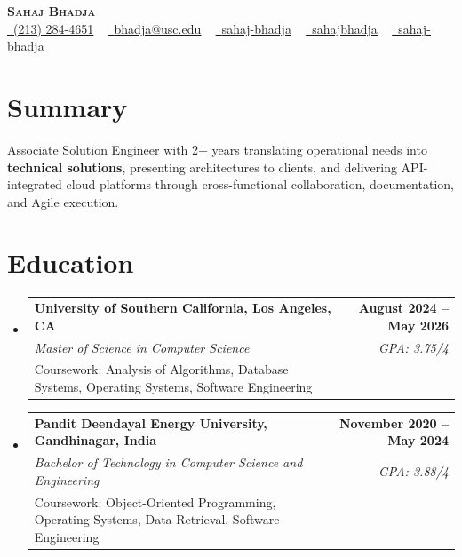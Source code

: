 \documentclass[letterpaper,10pt]{article}
\makeatletter
\newcommand{\sectionGap}{\vspace{-8pt}}
\newcommand{\resumeEduSubheading}[5]{\vspace{-1pt}\item\begin{tabular*}{1.0\textwidth}[t]{l@{\extracolsep{\fill}}r}\textbf{#1} & \textbf{\small #2} \\\textit{\small #3} & \textit{\small #4} \\\small #5 & \\\end{tabular*}\vspace{-4pt}}
\newcommand{\resumeSubHeadingListStart}{\begin{itemize}[leftmargin=0.0in, label={}]}
\newcommand{\resumeSubHeadingListEnd}{\end{itemize}}
\makeatother
\begin{document}
\begin{center}
{\Huge \scshape \textbf{Sahaj Bhadja}} \\ \vspace{1pt}
\small \href{tel:2132844651}{\faPhone\ \underline{(213) 284-4651}} ~ \href{mailto:bhadja@usc.edu}{\raisebox{-0.2\height}\faEnvelope\ \underline{bhadja@usc.edu}} ~
\href{https://www.linkedin.com/in/sahaj-bhadja/}{\raisebox{-0.2\height}\faLinkedin\ \underline{sahaj-bhadja}} ~ \href{https://github.com/SAHAJ-BHADJA}{\raisebox{-0.2\height}\faGithub\ \underline{sahajbhadja}} ~
\href{https://sahaj-bhadja.vercel.app/}{\raisebox{-0.2\height}\faGlobe\ \underline{sahaj-bhadja}}
\end{center}
\vspace{-16pt}
\section{Summary}
\begin{itemize}[leftmargin=0.15in, label={}]
\small{\item{Associate Solution Engineer with 2+ years translating operational needs into \textbf{technical solutions}, presenting architectures to clients, and delivering API-integrated cloud platforms through cross-functional collaboration, documentation, and Agile execution.}}
\end{itemize}
\sectionGap
\section{Education}
\resumeSubHeadingListStart
\resumeEduSubheading{University of Southern California, Los Angeles, CA}{August 2024 -- May 2026}{Master of Science in Computer Science}{GPA: 3.75/4}{Coursework: Analysis of Algorithms, Database Systems, Operating Systems, Software Engineering}
\resumeEduSubheading{Pandit Deendayal Energy University, Gandhinagar, India}{November 2020 -- May 2024}{Bachelor of Technology in Computer Science and Engineering}{GPA: 3.88/4}{Coursework: Object-Oriented Programming, Operating Systems, Data Retrieval, Software Engineering}
\resumeSubHeadingListEnd
\sectionGap
\end{document}
